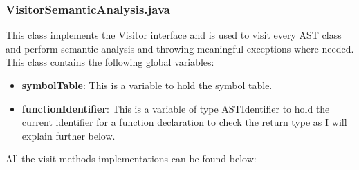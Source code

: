\documentclass{article}
\begin{document}
			\subsubsection{VisitorSemanticAnalysis.java}
			
			This class implements the Visitor interface and is used to visit every AST class and perform semantic analysis and throwing meaningful exceptions where needed. This class contains the following global variables:
			
					\begin{itemize}
			\item \textbf{symbolTable}: This is a variable to hold the symbol table.
			\item \textbf{functionIdentifier}: This is a variable of type ASTIdentifier to hold the current identifier for a function declaration to check the return type as I will explain further below.
			
			
			
			\end{itemize}
			
			\noindent All the visit methods implementations can be found below:
			
\end{document}
